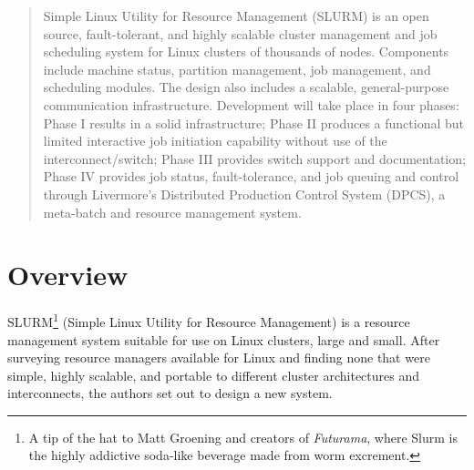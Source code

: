 \newcommand{\srun}{{\tt srun}}
\newcommand{\scancel}{{\tt scancel}}
\newcommand{\squeue}{{\tt squeue}}
\newcommand{\scontrol}{{\tt scontrol}}
\newcommand{\slurmctld}{{\tt slurmctld}}
\newcommand{\slurmd}{{\tt slurmd}}


\maketitle

\begin{abstract}
Simple Linux Utility for Resource Management (SLURM) is an open source,
fault-tolerant, and highly scalable cluster management and job 
scheduling system for Linux clusters of 
thousands of nodes.  Components include machine status, partition
management, job management, and scheduling modules.  The design also 
includes a scalable, general-purpose communication infrastructure.
Development will take place in four phases:  Phase I results in a solid
infrastructure;  Phase II produces a functional but limited interactive 
job initiation capability without use of the interconnect/switch; 
Phase III provides switch support and documentation; Phase IV provides 
job status, fault-tolerance, and job queuing and control through  
Livermore's Distributed Production Control System (DPCS), a meta-batch and
resource management system.
\end{abstract}

\vspace{0.25in}


\newpage

\section{Overview}

SLURM\footnote{A tip of the hat to Matt Groening and creators of {\em Futurama},
where Slurm is the highly addictive soda-like beverage made from worm
excrement.} (Simple Linux Utility for Resource Management) 
is a resource management 
system suitable for use on Linux clusters, large and small.  After 
surveying\cite{Jette2002} resource managers available for Linux and finding 
none that were simple, highly scalable, and portable to different cluster 
architectures and interconnects, the authors set out to design a new system.

